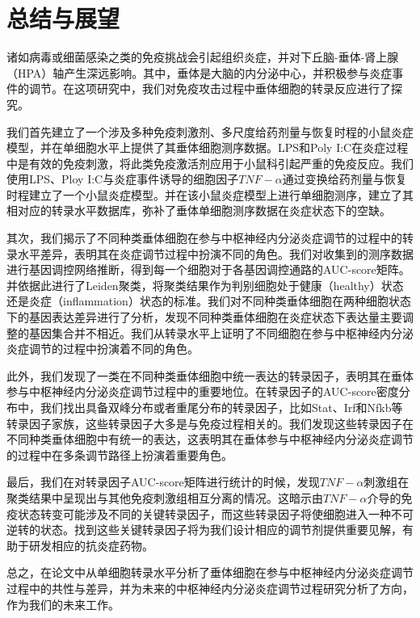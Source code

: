 
\chapter{总结与展望}
  诸如病毒或细菌感染之类的免疫挑战会引起组织炎症，并对下丘脑­-垂体­-肾上腺（HPA）轴产生深远影响。其中，垂体是大脑的内分泌中心，并积极参与炎症事件的调节。在这项研究中，我们对免疫攻击过程中垂体细胞的转录反应进行了探究。

  我们首先建立了一个涉及多种免疫刺激剂、多尺度给药剂量与恢复时程的小鼠炎症模型，并在单细胞水平上提供了其垂体细胞测序数据。LPS和Poly I:C在炎症过程中是有效的免疫刺激，将此类免疫激活剂应用于小鼠科引起严重的免疫反应。我们使用LPS、Ploy I:C与炎症事件诱导的细胞因子$TNF-\alpha$通过变换给药剂量与恢复时程建立了一个小鼠炎症模型。并在该小鼠炎症模型上进行单细胞测序，建立了其相对应的转录水平数据库，弥补了垂体单细胞测序数据在炎症状态下的空缺。

  其次，我们揭示了不同种类垂体细胞在参与中枢神经内分泌炎症调节的过程中的转录水平差异，表明其在炎症调节过程中扮演不同的角色。我们对收集到的测序数据进行基因调控网络推断，得到每一个细胞对于各基因调控通路的AUC-score矩阵。并依据此进行了Leiden聚类，将聚类结果作为判别细胞处于健康（healthy）状态还是炎症（inflammation）状态的标准。我们对不同种类垂体细胞在两种细胞状态下的基因表达差异进行了分析，发现不同种类垂体细胞在炎症状态下表达量主要调整的基因集合并不相近。我们从转录水平上证明了不同细胞在参与中枢神经内分泌炎症调节的过程中扮演着不同的角色。

  此外，我们发现了一类在不同种类垂体细胞中统一表达的转录因子，表明其在垂体参与中枢神经内分泌炎症调节过程中的重要地位。在转录因子的AUC-score密度分布中，我们找出具备双峰分布或者重尾分布的转录因子，比如Stat、Irf和Nfkb等转录因子家族，这些转录因子大多是与免疫过程相关的。我们发现这些转录因子在不同种类垂体细胞中有统一的表达，这表明其在垂体参与中枢神经内分泌炎症调节的过程中在多条调节路径上扮演着重要角色。

  最后，我们在对转录因子AUC-score矩阵进行统计的时候，发现$TNF-\alpha$刺激组在聚类结果中呈现出与其他免疫刺激组相互分离的情况。这暗示由$TNF-\alpha$介导的免疫状态转变可能涉及不同的关键转录因子，而这些转录因子将使细胞进入一种不可逆转的状态。找到这些关键转录因子将为我们设计相应的调节剂提供重要见解，有助于研发相应的抗炎症药物。

  总之，在论文中从单细胞转录水平分析了垂体细胞在参与中枢神经内分泌炎症调节过程中的共性与差异，并为未来的中枢神经内分泌炎症调节过程研究分析了方向，作为我们的未来工作。

